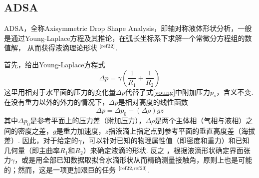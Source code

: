 \documentclass[a4paper,12pt]{article}%
\begin{document}
\subsection{ADSA}\label{adsa}
\begin{spacing}{1.528}%
ADSA，全称Axisymmetric Drop Shape Analysis，即轴对称液体形状分析，一般是通过Young-Laplace方程及其推论，在弧长坐标系下求解一个常微分方程组的数值解，
从而获得液滴理论形状
$^\text{\cite{ref22}}$. 

首先，给出Young-Laplace方程式
\begin{equation}
    \Delta p=\gamma\left(\frac{1}{R_1}+\frac{1}{R_2}\right)\label{laplace}
\end{equation}
这里用相对于水平面的压力的变化量$\Delta p$代替了式\eqref{young}中附加压力$p_s$，含义不变. 
在没有重力以外的外力的情况下，$\Delta p$是相对高度的线性函数
\begin{equation}
    \Delta p=\Delta p_0+(\Delta \rho )gz
\end{equation}
其中$\Delta p_0$是参考平面上的压力差（附加压力），$\Delta\rho$是两个主体相（气相与液相）之间的密度之差，$g$是重力加速度，$z$指液滴上指定点到参考平面的垂直高度差（海拔差）. 
因此，对于给定的$\gamma$，可以针对已知的物理属性值（即密度和重力）和已知几何量（即主曲率$R_1$和$R_2$）来确定液滴的形状. 反之 ，根据液滴形状确定界面张力$\gamma$，或是用全部已知数据取拟合水滴形状从而精确测量接触角，原则上也是可能的；然而，这是一项更加艰巨的任务
$^\text{\cite{ref22,ref23}}$. 


\end{spacing}
\end{document}
